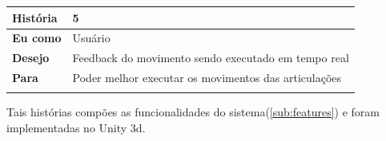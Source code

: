 \begin{table}[H]
\begin{tabular}{|l|l|}
 \textbf{História} & 5                                                        \\ \hline
 \textbf{Eu como}  & Usuário                                                  \\ \hline
 \textbf{Desejo}   & Feedback do movimento sendo executado em tempo real                    \\ \hline
 \textbf{Para}     & Poder melhor executar os movimentos das articulações           \\ \hline
 \multicolumn{2}{|l|}{}                                                       \\ \hline

 \end{tabular}
 \end{table}

   Tais histórias compões as funcionalidades do sistema(\ref{sub:features}) e foram implementadas no Unity 3d.
